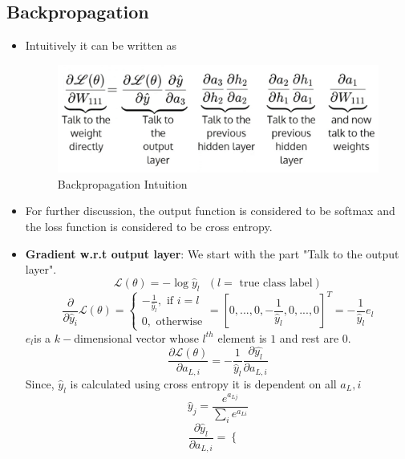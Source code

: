 \documentclass[a4paper]{article}
\begin{document}
\subsection{Backpropagation}
\begin{itemize}
    \item Intuitively it can be written as
    \begin{figure}[H]
        \centering
        \includegraphics[width=0.5\linewidth]{Degree//static/DL_backprop_intuitie.png}
        \caption{Backpropagation Intuition}
        \label{fig:DL-backprop-intuition}
    \end{figure}
    \item For further discussion, the output function is considered to be softmax and the loss function is considered to be cross entropy.
    \item \textbf{Gradient w.r.t output layer}: We start with the part "Talk to the output layer".
    \begin{equation*}
        \mathcal{L}(\theta) = -\log{\hat{y}_l}\text{ }(l=\text{ true class label})
    \end{equation*}
    \begin{equation*}
        \frac{\partial}{\partial \hat{y}_i}\mathcal{L}(\theta)=\begin{cases}
            -\frac{1}{\hat{y}_l},\text{ if }i=l\\
            0,\text{ otherwise}
        \end{cases}=[0,...,0,-\frac{1}{\hat{y}_l},0,...,0]^T=-\frac{1}{\hat{y}_l}e_l
    \end{equation*}
    $e_l$is a $k-$dimensional vector whose $l^{th}$ element is $1$ and rest are $0$.
    \begin{equation*}
        \frac{\partial \mathcal{L}(\theta)}{\partial a_{L,i}}=-\frac{1}{\hat{y}_l}\frac{\partial \hat{y_l}}{\partial a_{L,i}}
    \end{equation*}
    Since, $\hat{y}_l$ is calculated using cross entropy it is dependent on all $a_L,i$
    \begin{equation*}
        \hat{y}_j=\frac{e^{a_{Lj}}}{\sum_ie^{a_{Li}}}
    \end{equation*}
    \begin{equation*}
        \frac{\partial \hat{y}_l}{\partial a_{L,i}}=\begin{cases}

\end{cases}
\end{equation*}
\end{itemize}
\end{document}
